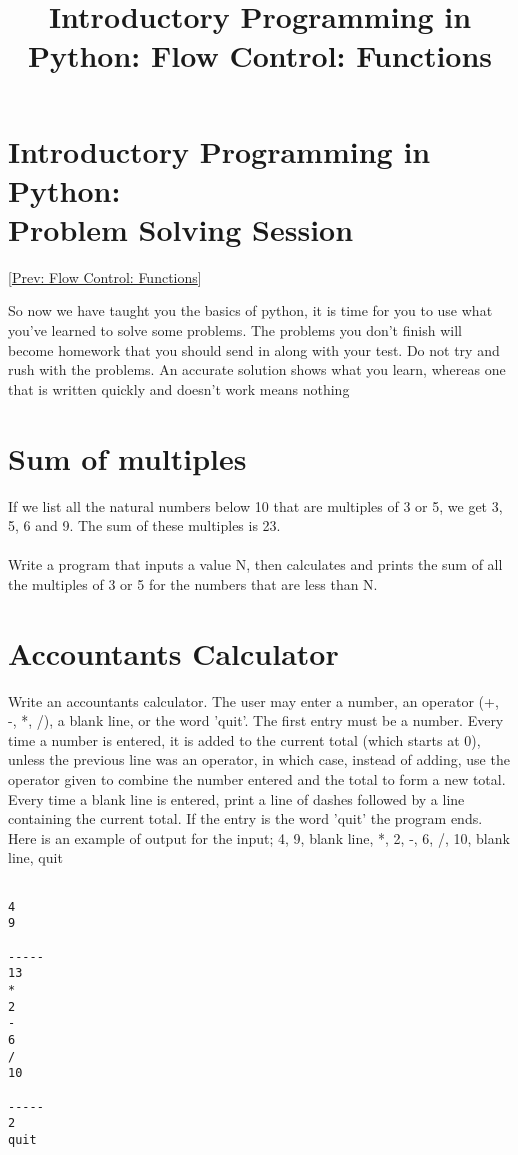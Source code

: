 \documentclass[a4paper,11pt]{article}
\title{Introductory Programming in Python: Flow Control: Functions}
\begin{document}
\section{Introductory Programming in Python: 
\\    Problem Solving Session}    [\href{functions.html}{Prev: Flow Control: Functions}]\nolinebreak 


So now we have taught you the basics of python, it is time for you to use what  you've learned to solve some problems. The problems you don't finish will become homework that  you should send in along with your test. Do not try and rush with the problems. An accurate solution  shows what you learn, whereas one that is written quickly and doesn't work means nothing

\section{Sum of multiples}

If we list all the natural numbers below 10 that are multiples of 3 or 5, we get 3, 5, 6 and 9.  The sum of these multiples is 23. 
\\
\\  Write a program that inputs a value N, then calculates and prints the sum of all the multiples of 3 or 5 for  the numbers that are less than N.

\section{Accountants Calculator}

Write an accountants calculator. The user may enter a number, an operator (+, -, *, /), a blank line, or the word 'quit'. The first entry must be a number. Every time a number is entered, it is added to the current total (which    starts at 0), unless the previous line was an operator, in which case, instead of adding, use the operator given to combine the number entered and the total to form a new total. Every time a blank line is entered, print a line of dashes followed by    a line containing the current total. If the entry is the word 'quit' the program ends. Here is an example of output for the input; 4, 9, blank line, *, 2, -, 6, /, 10, blank line, quit     
\begin{lstlisting}

4
9

-----
13
*
2
-
6
/
10

-----
2
quit
\end{lstlisting}
\end{document}
